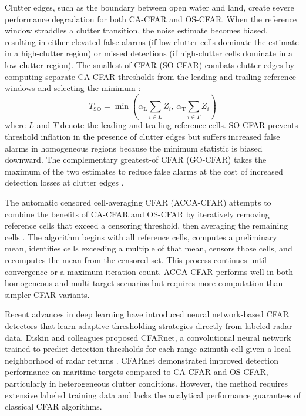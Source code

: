 Clutter edges, such as the boundary between open water and land, create severe performance degradation for both CA-CFAR and OS-CFAR. When the reference window straddles a clutter transition, the noise estimate becomes biased, resulting in either elevated false alarms (if low-clutter cells dominate the estimate in a high-clutter region) or missed detections (if high-clutter cells dominate in a low-clutter region). The smallest-of CFAR (SO-CFAR) combats clutter edges by computing separate CA-CFAR thresholds from the leading and trailing reference windows and selecting the minimum \cite{Trunk1978}:
\begin{equation}
T_{\text{SO}} = \min \left( \alpha_{\text{L}} \sum_{i \in L} Z_i, \, \alpha_{\text{T}} \sum_{i \in T} Z_i \right)
\end{equation}
where $L$ and $T$ denote the leading and trailing reference cells. SO-CFAR prevents threshold inflation in the presence of clutter edges but suffers increased false alarms in homogeneous regions because the minimum statistic is biased downward. The complementary greatest-of CFAR (GO-CFAR) takes the maximum of the two estimates to reduce false alarms at the cost of increased detection losses at clutter edges \cite{Hansen1972}.

The automatic censored cell-averaging CFAR (ACCA-CFAR) attempts to combine the benefits of CA-CFAR and OS-CFAR by iteratively removing reference cells that exceed a censoring threshold, then averaging the remaining cells \cite{Farina1987}. The algorithm begins with all reference cells, computes a preliminary mean, identifies cells exceeding a multiple of that mean, censors those cells, and recomputes the mean from the censored set. This process continues until convergence or a maximum iteration count. ACCA-CFAR performs well in both homogeneous and multi-target scenarios but requires more computation than simpler CFAR variants.

Recent advances in deep learning have introduced neural network-based CFAR detectors that learn adaptive thresholding strategies directly from labeled radar data. Diskin and colleagues proposed CFARnet, a convolutional neural network trained to predict detection thresholds for each range-azimuth cell given a local neighborhood of radar returns \cite{Diskin2024}. CFARnet demonstrated improved detection performance on maritime targets compared to CA-CFAR and OS-CFAR, particularly in heterogeneous clutter conditions. However, the method requires extensive labeled training data and lacks the analytical performance guarantees of classical CFAR algorithms.

